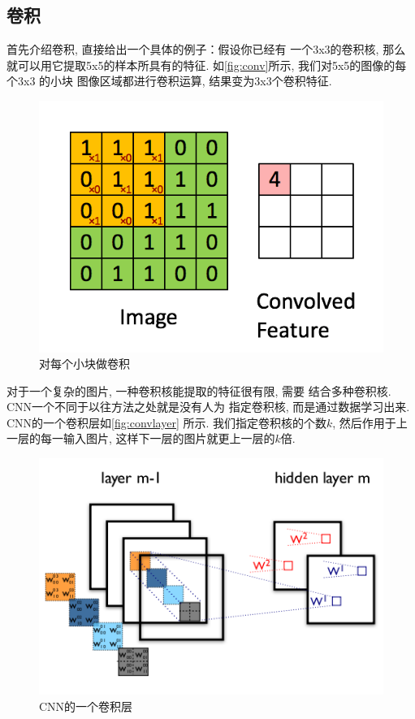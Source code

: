 \documentclass{ctexart}
\begin{document}
\subsection{卷积}

首先介绍卷积, 直接给出一个具体的例子：假设你已经有
一个3x3的卷积核, 那么就可以用它提取5x5的样本所具有的特征.
如\autoref{fig:conv}所示, 我们对5x5的图像的每个3x3 的小块
图像区域都进行卷积运算, 结果变为3x3个卷积特征.
\begin{figure}[htb]
  \centering
  \includegraphics[width=.8\textwidth]{conv}
  \caption{对每个小块做卷积}
  \label{fig:conv}
\end{figure}

对于一个复杂的图片, 一种卷积核能提取的特征很有限, 需要
结合多种卷积核. CNN一个不同于以往方法之处就是没有人为
指定卷积核, 而是通过数据学习出来. CNN的一个卷积层如\autoref{fig:convlayer}
所示. 我们指定卷积核的个数\(k\), 然后作用于上一层的每一输入图片,
这样下一层的图片就更上一层的\(k\)倍.
\begin{figure}[htb]
  \centering
  \includegraphics[width=.7\textwidth]{convlayer}
  \caption{CNN的一个卷积层}
  \label{fig:convlayer}
\end{figure}
\end{document}
